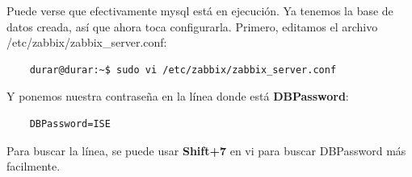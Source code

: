 \documentclass[a4paper]{article}
\begin{document}
\newpage
Puede verse que efectivamente mysql está en ejecución.\newline
Ya tenemos la base de datos creada, así que ahora toca configurarla.
Primero, editamos el archivo /etc/zabbix/zabbix\_server.conf:
\begin{lstlisting}
    durar@durar:~$ sudo vi /etc/zabbix/zabbix_server.conf
\end{lstlisting}
Y ponemos nuestra contraseña en la línea donde está \textbf{DBPassword}: 
\begin{lstlisting}
    DBPassword=ISE
\end{lstlisting}
Para buscar la línea, se puede usar \textbf{Shift+7} en vi para buscar DBPassword más 
facilmente.
\end{document}
